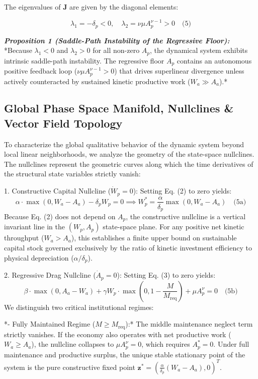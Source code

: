 \documentclass[preprint,12pt,authoryear]{elsarticle}
\theoremstyle{definition}
\begin{document}
The eigenvalues of $\mathbf{J}$ are given by the diagonal elements:

$$\lambda_1 = -\delta_p < 0, \quad \lambda_2 =\nu \mu A_p^{\nu - 1} > 0 \quad \text{(5)}$$

\textbf{\textit{Proposition 1 (Saddle-Path Instability of the Regressive Floor):}} *Because $\lambda_1 < 0$ and $\lambda_2 > 0$ for all non-zero $A_p$, the dynamical system exhibits intrinsic saddle-path instability. The regressive floor $A_p$ contains an autonomous positive feedback loop ($\nu \mu A_p^{\nu - 1} > 0$) that drives superlinear divergence unless actively counteracted by sustained kinetic productive work ($W_a \gg A_a$).*

\subsection{Global Phase Space Manifold, Nullclines \& Vector Field Topology}

To characterize the global qualitative behavior of the dynamic system beyond local linear neighborhoods, we analyze the geometry of the state-space nullclines. The nullclines represent the geometric curves along which the time derivatives of the structural state variables strictly vanish:

1. Constructive Capital Nullcline ($\dot{W}_p = 0$): Setting Eq. (2) to zero yields: $$\alpha \cdot \max(0, W_a - A_a) - \delta_p W_p = 0 \implies W_p^* = \frac{\alpha}{\delta_p} \max(0, W_a - A_a) \quad \text{(5a)}$$ Because Eq. (2) does not depend on $A_p$, the constructive nullcline is a vertical invariant line in the $(W_p, A_p)$ state-space plane. For any positive net kinetic throughput ($W_a > A_a$), this establishes a finite upper bound on sustainable capital stock governed exclusively by the ratio of kinetic investment efficiency to physical depreciation ($\alpha / \delta_p$).

2. Regressive Drag Nullcline ($\dot{A}_p = 0$): Setting Eq. (3) to zero yields: $$\beta \cdot \max(0, A_a - W_a) + \gamma W_p \cdot \max\left(0, 1 - \frac{M}{M_{\text{req}}}\right) + \mu A_p^\nu = 0 \quad \text{(5b)}$$ We distinguish two critical institutional regimes:

*- Fully Maintained Regime ($M \ge M_{\text{req}}$):* The middle maintenance neglect term strictly vanishes. If the economy also operates with net productive work ($W_a \ge A_a$), the nullcline collapses to $\mu A_p^\nu = 0$, which requires $A_p^* = 0$. Under full maintenance and productive surplus, the unique stable stationary point of the system is the pure constructive fixed point $\mathbf{z}^* = \left(\frac{\alpha}{\delta_p}(W_a - A_a), 0\right)^T$.
\end{document}
